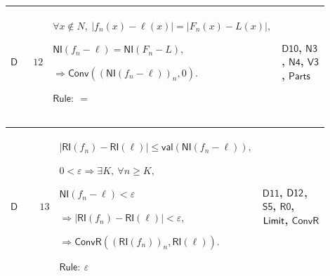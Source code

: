 \documentclass[12pt,reqno]{amsart}
\theoremstyle{blueplain}
\numberwithin{equation}{section}
\begin{document}
{\scriptsize \setlength{\parskip}{0pt}\nointerlineskip
\noindent 
\begin{tabular}{|@{}>{\centering\arraybackslash}m{0.10658\linewidth}|>{\centering\arraybackslash}m{0.03553\linewidth}|>{\centering\arraybackslash}m{0.52105\linewidth}|>{\centering\arraybackslash}m{0.23684\linewidth}|}
\hline
\hypertarget{dct:D12}{$\displaystyle \mathsf{D}$} & $\displaystyle 12$ & $%
\displaystyle \forall x\notin N,\ |f_n(x)-\ell(x)|=|F_n(x)-L(x)|,$\par$%
\displaystyle \mathsf{NI}(f_n-\ell)=\mathsf{NI}(F_n-L),$\par$\displaystyle %
\Rightarrow\mathsf{Conv}((\mathsf{NI}(f_n-\ell))_n,0).$\par$\displaystyle 
\mathsf{Rule}:\ =$ & \hyperlink{dct:D10}{$\displaystyle \mathsf{D10}$}, 
\hyperlink{dct:N3}{$\displaystyle \mathsf{N3}$}, \hyperlink{dct:N4}{$%
\displaystyle \mathsf{N4}$}, \hyperlink{dct:V3}{$\displaystyle \mathsf{V3}$}%
, \hyperlink{dctdef:Parts}{$\displaystyle \mathsf{Parts}$} \\ \hline
\end{tabular}%
}

{\scriptsize \setlength{\parskip}{0pt}\nointerlineskip
\noindent 
\begin{tabular}{|@{}>{\centering\arraybackslash}m{0.10658\linewidth}|>{\centering\arraybackslash}m{0.03553\linewidth}|>{\centering\arraybackslash}m{0.52105\linewidth}|>{\centering\arraybackslash}m{0.23684\linewidth}|}
\hline
\hypertarget{dct:D13}{$\displaystyle \mathsf{D}$} & $\displaystyle 13$ & $%
\displaystyle |\mathsf{RI}(f_n)-\mathsf{RI}(\ell)|\le\mathsf{val}(\mathsf{NI}%
(f_n-\ell)),$\par$\displaystyle 0<\varepsilon\Rightarrow\exists K,\ \forall
n\ge K,$\par$\displaystyle \mathsf{NI}(f_n-\ell)<\varepsilon$\par$%
\displaystyle \Rightarrow|\mathsf{RI}(f_n)-\mathsf{RI}(\ell)|<\varepsilon,$%
\par$\displaystyle \Rightarrow\mathsf{ConvR}((\mathsf{RI}(f_n))_n,\mathsf{RI}%
(\ell)).$\par$\displaystyle \mathsf{Rule}:\ \varepsilon$ & \hyperlink{dct:D11}%
{$\displaystyle \mathsf{D11}$}, \hyperlink{dct:D12}{$\displaystyle \mathsf{%
D12}$}, \hyperlink{dct:S5}{$\displaystyle \mathsf{S5}$}, \hyperlink{dct:R0}{$%
\displaystyle \mathsf{R0}$}, \hyperlink{def:Limit}{$\displaystyle \mathsf{%
Limit}$}, \hyperlink{dctdef:ConvR}{$\displaystyle \mathsf{ConvR}$} \\ \hline
\end{tabular}%
}
\end{document}
